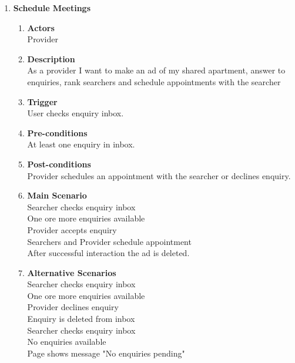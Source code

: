 \documentclass{scrreprt}
\begin{document}
\begin{enumerate}
	\item \textbf{Schedule Meetings}
	\begin{enumerate}
		\item \textbf{Actors}  \\
			Provider\\

		\item \textbf{Description} \\
			As a provider I want to make an ad of my shared apartment, answer to enquiries, rank searchers and schedule appointments with the searcher\\

		\item \textbf{Trigger} \\
			User checks enquiry inbox.\\

		\item \textbf{Pre-conditions} \\
			At least one enquiry in inbox.\\

		\item \textbf{Post-conditions} \\
			Provider schedules an appointment with the searcher or declines enquiry.\\

		\item \textbf{Main Scenario} \\
			Searcher checks enquiry inbox\\
			One ore more enquiries available\\
			Provider accepts enquiry\\
			Searchers and Provider schedule appointment\\
			After successful interaction the ad is deleted.\\

		\item \textbf{Alternative Scenarios} \\
			Searcher checks enquiry inbox\\
			One ore more enquiries available\\
			Provider declines enquiry\\
			Enquiry is deleted from inbox\\
			
			Searcher checks enquiry inbox\\
			No enquiries available\\
			Page shows message "No enquiries pending"\\


\end{enumerate}
\end{enumerate}
\end{document}
